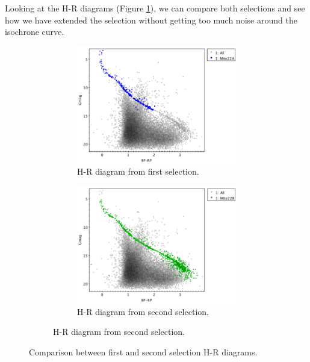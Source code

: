 \documentclass[11pt, a4paper, english]{book}
\begin{document}
Looking at the H-R diagrams (Figure \ref{fig:clusterix_selection_hr_diagrams_melotte_22}),
we can compare both selections and see how we have extended the selection without getting too much noise around the isochrone curve.

\begin{figure}[htbp]
  \centering
  \begin{subfigure}{0.9\textwidth}
    \centering
    \begin{subfigure}[t]{0.45\textwidth}
      \centering
      \includegraphics[width=\textwidth]{../figures/clusterix/topcat_1st_selection_hr_diagram_melotte_22.png}
      \caption{H-R diagram from first selection.}
    \end{subfigure}
    \hfill
    \begin{subfigure}[t]{0.45\textwidth}
      \centering
      \includegraphics[width=\textwidth]{../figures/clusterix/topcat_2nd_selection_hr_diagram_melotte_22.png}
      \caption{H-R diagram from second selection.}
    \end{subfigure}
  \end{subfigure}
  \caption{Comparison between first and second selection H-R diagrams.}
  \label{fig:clusterix_selection_hr_diagrams_melotte_22}
\end{figure}
\end{document}
